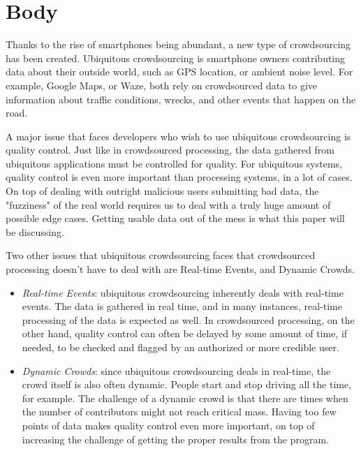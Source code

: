 \documentclass[10pt,twocolumn]{article}
\begin{document}
	\section*{Body}
	    Thanks to the rise of smartphones being abundant, a new type of crowdsourcing has been created. Ubiquitous crowdsourcing is smartphone owners contributing data about their outside world, such as GPS location, or ambient noise level. For example, Google Maps, or Waze, both rely on crowdsourced data to give information about traffic conditions, wrecks, and other events that happen on the road. 
	    
	    A major issue that faces developers who wish to use ubiquitous crowdsourcing is quality control. Just like in crowdsourced processing, the data gathered from ubiquitous applications must be controlled for quality. For ubiquitous systems, quality control is even more important than processing systems, in a lot of cases. On top of dealing with outright malicious users submitting bad data, the "fuzziness" of the real world requires us to deal with a truly huge amount of possible edge cases. Getting usable data out of the mess is what this paper will be discussing.
	    
	    Two other issues that ubiquitous crowdsourcing faces that crowdsourced processing doesn't have to deal with are Real-time Events, and Dynamic Crowds.
	    \begin{itemize}
	        \item \emph{Real-time Events}: ubiquitous crowdsourcing inherently deals with real-time events. The data is gathered in real time, and in many instances, real-time processing of the data is expected as well. %
	        In crowdsourced processing, on the other hand, quality control can often be delayed by some amount of time, if needed, to be checked and flagged by an authorized or more credible user. 
	        
	        
	        \item \emph{Dynamic Crowds}: since ubiquitous crowdsourcing deals in real-time, the crowd itself is also often dynamic. People start and stop driving all the time, for example. The challenge of a dynamic crowd is that there are times when the number of contributors might not reach critical mass. Having too few points of data makes quality control even more important, on top of increasing the challenge of getting the proper results from the program.
	    \end{itemize}
	    
\end{document}
